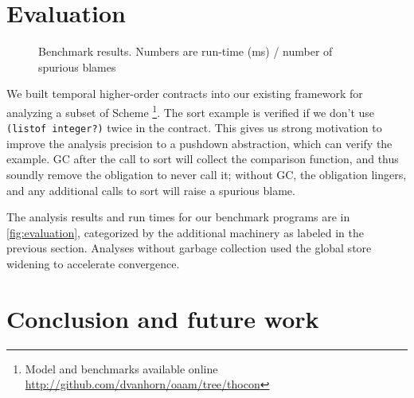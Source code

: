 \section{Evaluation}

\begin{figure}
  
  \caption{Benchmark results. Numbers are run-time (ms) / number of spurious blames}
  \label{fig:evaluation}
\end{figure}
We built temporal higher-order contracts into our existing framework for analyzing a subset of Scheme \footnote{Model and benchmarks available online \url{http://github.com/dvanhorn/oaam/tree/thocon}}.
%
The sort example is verified if we don't use \texttt{(listof integer?)} twice in the contract.
%
This gives us strong motivation to improve the analysis precision to a pushdown abstraction, which can verify the example.
%
GC after the call to sort will collect the comparison function, and thus soundly remove the obligation to never call it; without GC, the obligation lingers, and any additional calls to sort will raise a spurious blame.


The analysis results and run times for our benchmark programs are in \autoref{fig:evaluation}, categorized by the additional machinery as labeled in the previous section.
%
Analyses without garbage collection used the global store widening to accelerate convergence.
\section{Conclusion and future work} \label{sec:conclusion}

